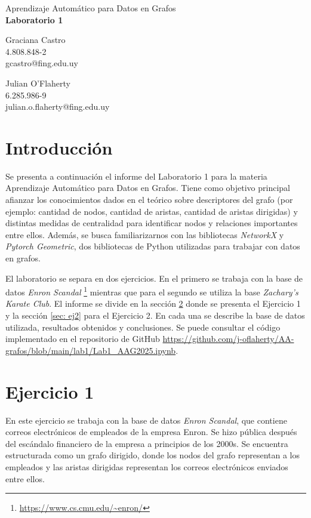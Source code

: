 \documentclass{article}
\begin{document}
\begin{center}
    {\Large Aprendizaje Automático para Datos en Grafos} \\
    {\LARGE \textbf{Laboratorio 1}} \\
    \vspace{2em}
    \begin{minipage}{0.45\textwidth}
        \centering
        Graciana Castro \\
        4.808.848-2 \\
        gcastro@fing.edu.uy
    \end{minipage}
    \hfill
    \begin{minipage}{0.45\textwidth}
        \centering
        Julian O'Flaherty \\
        6.285.986-9 \\
        julian.o.flaherty@fing.edu.uy
    \end{minipage}
\end{center}


\section{Introducción}
Se presenta a continuación el informe del Laboratorio 1 para la materia Aprendizaje Automático para Datos en Grafos. Tiene como objetivo principal afianzar los conocimientos dados en el teórico sobre descriptores del grafo (por ejemplo: cantidad de nodos, cantidad de aristas, cantidad de aristas dirigidas) y distintas medidas de centralidad para identificar nodos y relaciones importantes entre ellos. Además, se busca familiarizarnos con las bibliotecas \textit{NetworkX} y \textit{Pytorch Geometric}, dos bibliotecas de Python utilizadas para trabajar con datos en grafos.

El laboratorio se separa en dos ejercicios. En el primero se trabaja con la base de datos \textit{Enron Scandal} \footnote{\url{https://www.cs.cmu.edu/~enron/}} mientras que para el segundo se utiliza la base \textit{Zachary's Karate Club}. El informe se divide en la sección \ref{sec: ej1} donde se presenta el Ejercicio 1 y la sección \ref{sec: ej2} para el Ejercicio 2. En cada una se describe la base de datos utilizada, resultados obtenidos y conclusiones. Se puede consultar el código implementado en el repositorio de GitHub \url{https://github.com/j-oflaherty/AA-grafos/blob/main/lab1/Lab1_AAG2025.ipynb}.

\section{Ejercicio 1} \label{sec: ej1}
En este ejercicio se trabaja con la base de datos \textit{Enron Scandal}, que contiene correos electrónicos de empleados de la empresa Enron. Se hizo pública después del escándalo financiero de la empresa a principios de los 2000s. Se encuentra estructurada como un grafo dirigido, donde los nodos del grafo representan a los empleados y las aristas dirigidas representan los correos electrónicos enviados entre ellos.
\end{document}
